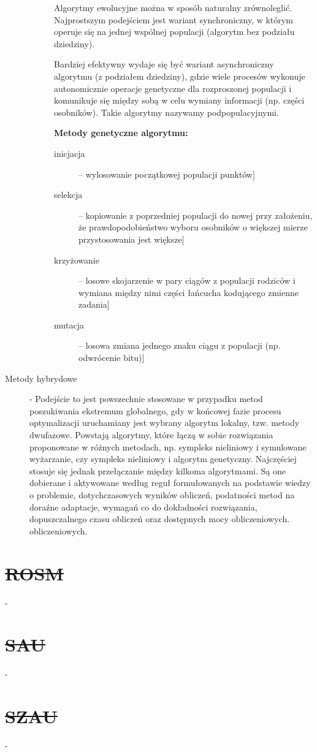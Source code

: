 \begin{description}
\begin{description}
        Algorytmy ewolucyjne można w sposób naturalny zrównoleglić. Najprostszym podejściem jest wariant synchroniczny, w którym operuje się na jednej wspólnej populacji (algorytm bez podziału dziedziny).
        
        Bardziej efektywny wydaje się być wariant asynchroniczny algorytmu (z podziałem dziedziny), gdzie wiele procesów wykonuje autonomicznie operacje genetyczne dla rozproszonej populacji i komunikuje się między sobą w celu wymiany informacji (np. części osobników). Takie algorytmy nazywamy podpopulacyjnymi.
        
        \textbf{Metody genetyczne algorytmu:}\mbox{}
        \begin{description}
            \item[inicjacja] – wylosowanie początkowej populacji punktów]
            \item[selekcja] – kopiowanie z poprzedniej populacji do nowej przy założeniu, że prawdopodobieństwo wyboru osobników o większej mierze przystosowania jest większe]
            \item[krzyżowanie] – losowe skojarzenie w pary ciągów z populacji rodziców i wymiana między nimi części łańcucha kodującego zmienne zadania]
            \item[mutacja] – losowa zmiana jednego znaku ciągu z populacji (np. odwrócenie bitu)]
        \end{description}
    \end{description}
    \item[Metody hybrydowe] - Podejście to jest powszechnie stosowane w przypadku metod poszukiwania ekstremum globalnego, gdy w końcowej fazie procesu optymalizacji uruchamiany jest wybrany algorytm lokalny, tzw. metody dwufazowe. Powstają algorytmy, które łączą w sobie rozwiązania proponowane w różnych metodach, np. sympleks nieliniowy i symulowane wyżarzanie, czy sympleks nieliniowy i algorytm genetyczny. Najczęściej stosuje się jednak przełączanie między kilkoma algorytmami. Są one dobierane i aktywowane według reguł formułowanych na podstawie wiedzy o problemie, dotychczasowych wyników obliczeń, podatności metod na doraźne adaptacje, wymagań co do dokładności rozwiązania, dopuszczalnego czasu obliczeń oraz dostępnych mocy obliczeniowych.
obliczeniowych.
\end{description}

\section{\sout{ROSM}}
-

\section{\sout{SAU}}
-

\section{\sout{SZAU}}
-